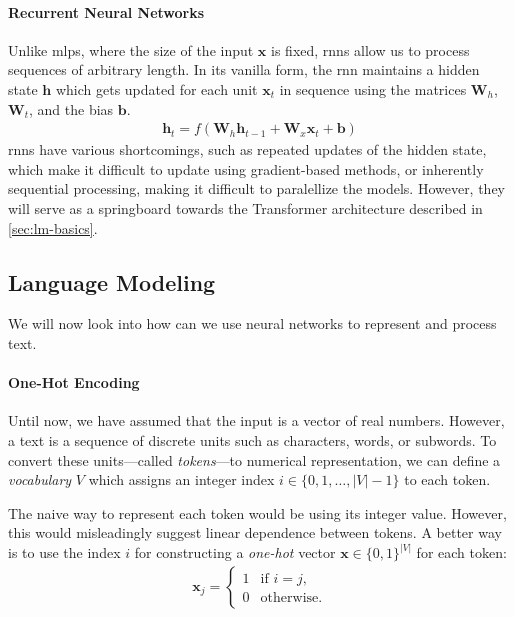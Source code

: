 \paragraph{Recurrent Neural Networks} Unlike \acp{mlp}, where the size of the input $\mathbf{x}$ is fixed, \acp{rnn} allow us to process sequences of arbitrary length. In its vanilla form, the \ac{rnn} maintains a hidden state $\mathbf{h}$ which gets updated for each unit $\mathbf{x}_t$ in sequence using the matrices $\mathbf{W}_h$, $\mathbf{W}_t$, and the bias $\mathbf{b}$.
\begin{align}
    \mathbf{h}_t = f(\mathbf{W}_h \mathbf{h}_{t-1} + \mathbf{W}_x \mathbf{x}_t + \mathbf{b})
\end{align}
\acp{rnn} have various shortcomings, such as repeated updates of the hidden state, which make it difficult to update using gradient-based methods, or inherently sequential processing, making it difficult to paralellize the models. However, they will serve as a springboard towards the Transformer architecture described in \autoref{sec:lm-basics}.


\subsection{Language Modeling}
\label{sec:lm-basics}
We will now look into how can we use neural networks to represent and process text.


\paragraph{One-Hot Encoding} Until now, we have assumed that the input is a vector of real numbers. However, a text is a sequence of discrete units such as characters, words, or subwords. To convert these units---called \textit{tokens}---to numerical representation, we can define a \textit{vocabulary} $V$ which assigns an integer index $i \in \{0, 1, \ldots, |V|-1\}$ to each token.

The naive way to represent each token would be using its integer value. However, this would misleadingly suggest linear dependence between tokens. A better way is to use the index $i$ for constructing a \textit{one-hot} vector $\mathbf{x} \in \{0,1\}^{|V|} $ for each token:
\begin{align}
    \mathbf{x}_j = \begin{cases}
        1 & \text{if } i = j, \\
        0 & \text{otherwise}.
    \end{cases}
\end{align}

